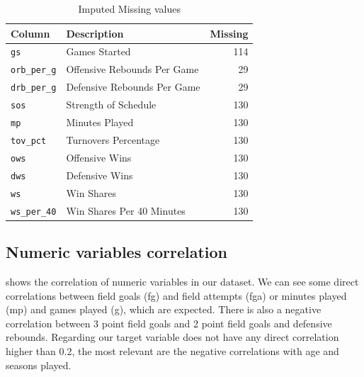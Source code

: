 \begin{table}[htb]
  \centering
  \caption{Imputed Missing values}%
  \label{tab:missing-values}
  \begin{tabular}{llr}
    \toprule
    \textbf{Column} & \textbf{Description} & \textbf{Missing} \\
    \midrule
    \texttt{gs}          & Games Started               & 114 \\
    \texttt{orb\_per\_g} & Offensive Rebounds Per Game & 29  \\
    \texttt{drb\_per\_g} & Defensive Rebounds Per Game & 29  \\
    \texttt{sos}         & Strength of Schedule        & 130 \\
    \texttt{mp}          & Minutes Played              & 130 \\
    \texttt{tov\_pct}    & Turnovers Percentage        & 130 \\
    \texttt{ows}         & Offensive Wins              & 130 \\
    \texttt{dws}         & Defensive Wins              & 130 \\
    \texttt{ws}          & Win Shares                  & 130 \\
    \texttt{ws\_per\_40} & Win Shares Per 40 Minutes   & 130 \\
    \bottomrule
  \end{tabular}
\end{table}

\subsection{Numeric variables correlation}%
\label{sub:numeric-corr}

 shows the correlation of numeric variables in our dataset. We can see some direct
correlations between field goals (fg) and field attempts (fga) or
minutes played (mp) and games played (g),
which are expected.
There is also a negative correlation between 3 point field goals and 2 point field goals
and defensive rebounds. Regarding our target variable does not have any direct correlation higher than 0.2,
the most relevant are the negative correlations with age and seasons played.

